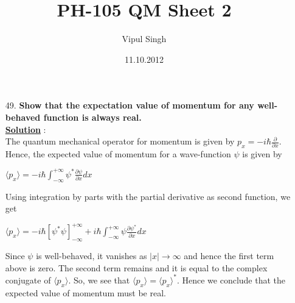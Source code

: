 \documentclass[12pt, a4paper]{article}
\begin{document}
\title{PH-105 QM Sheet 2}
\date{11.10.2012}
\author{Vipul Singh}
\maketitle
\begin{enumerate}
\item[49.]{\bf Show that the expectation value of momentum for any well-behaved function is always real.}\\

{\underline {\bf Solution}} : \\
The quantum mechanical operator for momentum is given by $p_{x}=-i\hbar\frac{\partial}{\partial x}$.\\
Hence, the expected value of momentum for a wave-function $\psi$ is given by\\
\begin{center}
$\langle p_{x}\rangle = -i\hbar \int_{-\infty}^{+\infty} \psi^{*} \frac{\partial\psi}{\partial x} dx$  
\end{center}
Using integration by parts with the partial derivative as second function, we get
\begin{center}
$\langle p_{x}\rangle = -i\hbar [\psi^{*}\psi]_{-\infty}^{+\infty} + i\hbar \int_{-\infty}^{+\infty} \psi \frac{\partial\psi^{*}}{\partial x} dx$
\end{center}
Since $\psi$ is well-behaved, it vanishes as $|x|\rightarrow\infty$ and hence the first term above is zero. The second term remains and it is equal to the complex conjugate of $\langle p_{x}\rangle$. So, we see that $\langle p_{x}\rangle = \langle p_{x}\rangle ^{*}$. Hence we conclude that the expected value of momentum must be real.
\end{enumerate}
\end{document}
